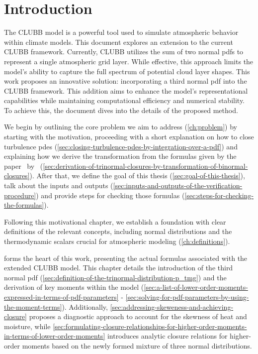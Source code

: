 \chapter{Introduction}\label{ch:introduction}

The \gls{CLUBB} model is a powerful tool used to simulate atmospheric behavior within climate models.
This document explores an extension to the current \gls{CLUBB} framework.
Currently, \gls{CLUBB} utilizes the sum of two normal \glspl{pdf}
to represent a single atmospheric grid layer.
While effective,
this approach limits the model's ability to capture the full spectrum of potential cloud layer shapes.
This work proposes an innovative solution:
incorporating a third normal \gls{pdf} into the \gls{CLUBB} framework.
This addition aims to enhance the model's representational capabilities
while maintaining computational efficiency and numerical stability.
To achieve this, the document dives into the details of the proposed method.

We begin by outlining the core problem we aim to address (\cref{ch:problem})
by starting with the motivation,
proceeding with a short explanation on how to close turbulence \glspl{pde}
(\cref{sec:closing-turbulence-pdes-by-integration-over-a-pdf})
and explaining how we derive the transformation from the formulas
given by the paper~ by~\citeauthor{larson2005using}
(\cref{sec:derivation-of-trinormal-closures-by-transformation-of-binormal-closures}).
After that, we define the goal of this thesis (\cref{sec:goal-of-this-thesis}),
talk about the inputs and outputs (\cref{sec:inputs-and-outputs-of-the-verification-procedure})
and provide steps for checking those formulas (\cref{sec:steps-for-checking-the-formulas}).

Following this motivational chapter,
we establish a foundation with clear definitions of the relevant concepts,
including normal distributions and the thermodynamic scalars
crucial for atmospheric modeling (\cref{ch:definitions}).

 forms the heart of this work,
presenting the actual formulas associated with the extended \gls{CLUBB} model.
This chapter details the introduction of the third normal \gls{pdf} (\cref{sec:definition-of-the-trinormal-distribution-p_tmg})
and the derivation of key moments within the model
(\cref{sec:a-list-of-lower-order-moments-expressed-in-terms-of-pdf-parameters} -
\cref{sec:solving-for-pdf-parameters-by-using-the-moment-terms}).
Additionally,
\cref{sec:addressing-skeweness-and-achieving-closure} proposes a diagnostic approach
to account for the skewness of heat and moisture,
while \cref{sec:formulating-closure-relationships-for-higher-order-moments-in-terms-of-lower-order-moments}
introduces analytic closure relations
for higher-order moments based on the newly formed mixture of three normal distributions.

